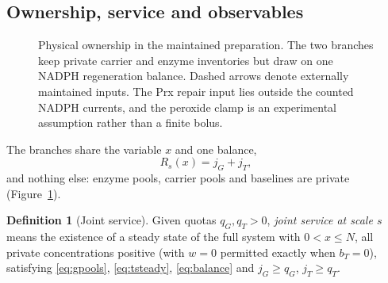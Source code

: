 \documentclass[11pt,a4paper]{article}
\theoremstyle{plain}
\theoremstyle{definition}
\newtheorem{definition}[theorem]{Definition}
\theoremstyle{remark}
\begin{document}
\subsection{Ownership, service and observables}

\begin{figure}[tb]
\centering
{}
\caption{Physical ownership in the maintained preparation. The two branches keep
private carrier and enzyme inventories but draw on one NADPH regeneration
balance. Dashed arrows denote externally maintained inputs. The Prx repair
input lies outside the counted NADPH currents, and the peroxide clamp is an
experimental assumption rather than a finite bolus.}
\label{fig:scheme}
\end{figure}

The branches share the variable $x$ and one balance,
\begin{equation}\label{eq:balance}
  R_s(x)=j_G+j_T ,
\end{equation}
and nothing else: enzyme pools, carrier pools and baselines are private
(Figure~\ref{fig:scheme}).

\begin{definition}[Joint service]\label{def:service}
Given quotas $q_G,q_T>0$, \emph{joint service at scale $s$} means the existence of
a steady state of the full system with $0<x\le N$, all private concentrations
positive (with $w=0$ permitted exactly when $b_T=0$), satisfying
\eqref{eq:gpools}, \eqref{eq:tsteady}, \eqref{eq:balance} and
$j_G\ge q_G$, $j_T\ge q_T$.
\end{definition}
\end{document}
